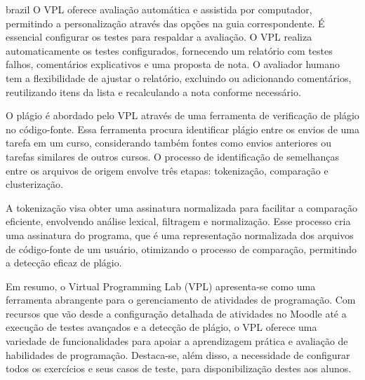 \begin{otherlanguage*}{brazil}
O VPL oferece avaliação automática e assistida por computador, permitindo a personalização através das opções na guia correspondente. É essencial configurar os testes para respaldar a avaliação. O VPL realiza automaticamente os testes configurados, fornecendo um relatório com testes falhos, comentários explicativos e uma proposta de nota. O avaliador humano tem a flexibilidade de ajustar o relatório, excluindo ou adicionando comentários, reutilizando itens da lista e recalculando a nota conforme necessário.

O plágio é abordado pelo VPL através de uma ferramenta de verificação de plágio no código-fonte. Essa ferramenta procura identificar plágio entre os envios de uma tarefa em um curso, considerando também fontes como envios anteriores ou tarefas similares de outros cursos. O processo de identificação de semelhanças entre os arquivos de origem envolve três etapas: tokenização, comparação e clusterização. 

A tokenização visa obter uma assinatura normalizada para facilitar a comparação eficiente, envolvendo análise lexical, filtragem e normalização. Esse processo cria uma assinatura do programa, que é uma representação normalizada dos arquivos de código-fonte de um usuário, otimizando o processo de comparação, permitindo a detecção eficaz de plágio.

Em resumo, o Virtual Programming Lab (VPL) apresenta-se como uma ferramenta abrangente para o gerenciamento de atividades de programação. Com recursos que vão desde a configuração detalhada de atividades no Moodle até a execução de testes avançados e a detecção de plágio, o VPL oferece uma variedade de funcionalidades para apoiar a aprendizagem prática e avaliação de habilidades de programação. Destaca-se, além disso, a necessidade de configurar todos os exercícios e seus casos de teste, para disponibilização destes aos alunos.

\end{otherlanguage*}
